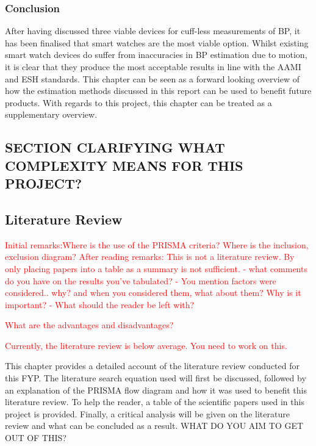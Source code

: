 \subsubsection{Conclusion}
After having discussed three viable devices for cuff-less measurements of BP, it has been finalised that smart 
watches are the most viable option. Whilst existing smart watch devices do suffer from inaccuracies in BP estimation
 due to motion, it is clear that they produce the most acceptable results in line with the AAMI and ESH standards. This 
 chapter can be seen as a forward looking overview of how the estimation methods discussed in this report can be used to
  benefit future products. With regards to this project, this chapter can be treated as a supplementary overview.





\subsection{SECTION CLARIFYING WHAT COMPLEXITY MEANS FOR THIS PROJECT?}

 \subsection{Literature Review}

\textcolor{red}{Initial remarks:Where is the use of the PRISMA criteria? Where is the inclusion, exclusion diagram?}
\textcolor{red}{After reading remarks:}
\textcolor{red}{This is not a literature review. By only placing papers into a table as a summary is not sufficient.}
\textcolor{red}{- what comments do you have on the results you've tabulated?}
\textcolor{red}{- You mention factors were considered.. why? and when you considered them, what about them? Why is it important?}
\textcolor{red}{- What should the reader be left with?}

\textcolor{red}{What are the advantages and disadvantages?}

\textcolor{red}{Currently, the literature review is below average. You need to work on this.}

This chapter provides a detailed account of the literature review conducted for this FYP. 
The literature search equation used will first be discussed, followed by an explanation of the PRISMA 
flow diagram and how it was used to benefit this literature review. To help the reader, 
a table of the scientific papers used in this project is provided. Finally, a critical analysis 
will be given on the literature review and what can be concluded as a result. WHAT DO YOU AIM TO GET OUT OF THIS?

